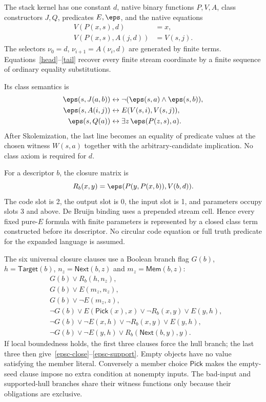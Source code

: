 The stack kernel has one constant $d$, native binary functions $P,V,A$,
class constructors $J,Q$, predicates $E,\eps$, and the native equations
\begin{align}
 V(P(x,s),d)&=x,\label{head}\\
 V(P(x,s),A(j,d))&=V(s,j).\label{tail}
\end{align}
The selectors $\nu_0=d$, $\nu_{i+1}=A(\nu_i,d)$ are generated by finite
terms. Equations~\eqref{head}--\eqref{tail} recover every finite stream
coordinate by a finite sequence of ordinary equality substitutions.

Its class semantics is
\begin{align}
 \eps(s,J(a,b))&\leftrightarrow\neg(\eps(s,a)\land\eps(s,b)),\label{class-nand}\\
 \eps(s,A(i,j))&\leftrightarrow E(V(s,i),V(s,j)),\label{class-atom}\\
 \eps(s,Q(a))&\leftrightarrow\exists z\,\eps(P(z,s),a).\label{class-exists}
\end{align}
After Skolemization, the last line becomes an equality of predicate values
at the chosen witness $W(s,a)$ together with the arbitrary-candidate
implication. No class axiom is required for $d$.

For a descriptor $b$, the closure matrix is
\[
 R_b(x,y)=\eps(P(y,P(x,b)),V(b,d)).
\]
The code slot is 2, the output slot is 0, the input slot is 1, and parameters
occupy slots 3 and above. De Bruijn binding uses a prepended stream cell.
Hence every fixed pure-$E$ formula with finite parameters is represented
by a closed class term constructed before its descriptor. No circular code
equation or full truth predicate for the expanded language is assumed.

The six universal closure clauses use a Boolean branch flag $G(b)$,
$h=\mathsf{Target}(b)$, $n_z=\mathsf{Next}(b,z)$ and
$m_z=\mathsf{Mem}(b,z)$:
\begin{align*}
 &G(b)\lor R_b(h,n_z),\\
 &G(b)\lor E(m_z,n_z),\\
 &G(b)\lor\neg E(m_z,z),\\
 &\neg G(b)\lor E(\mathsf{Pick}(x),x)\lor\neg R_b(x,y)\lor E(y,h),\\
 &\neg G(b)\lor\neg E(x,h)\lor\neg R_b(x,y)\lor E(y,h),\\
 &\neg G(b)\lor\neg E(y,h)\lor R_b(\mathsf{Next}(b,y),y).
\end{align*}
If local boundedness holds, the first three clauses force the hull branch;
the last three then give~\eqref{epsc-close}--\eqref{epsc-support}. Empty
objects have no value satisfying the member literal. Conversely a member
choice $\mathsf{Pick}$ makes the empty-seed clause impose no extra condition
at nonempty inputs. The bad-input and supported-hull branches share their
witness functions only because their obligations are exclusive.

